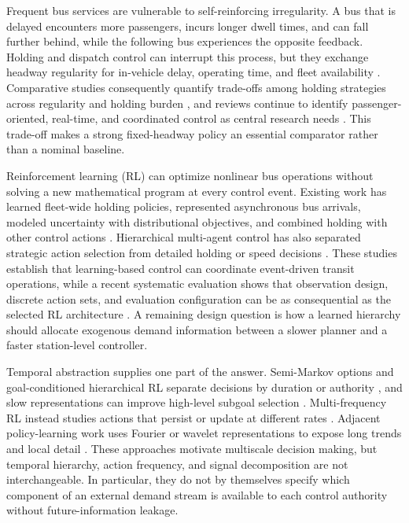 \documentclass[preprint,12pt,authoryear,nopreprintline]{elsarticle}
\begin{document}
Frequent bus services are vulnerable to self-reinforcing irregularity. A
bus that is delayed encounters more passengers, incurs longer dwell
times, and can fall further behind, while the following bus experiences
the opposite feedback. Holding and dispatch control can interrupt this
process, but they exchange headway regularity for in-vehicle delay,
operating time, and fleet availability
\citep{daganzo2009headway, xuan2011dynamic}. Comparative studies
consequently quantify trade-offs among holding strategies across
regularity and holding burden \citep{berrebi2018comparing}, and reviews
continue to identify passenger-oriented, real-time, and coordinated
control as central research needs
\citep{ibarra2015planning, gkiotsalitis2021atstop}. This trade-off makes
a strong fixed-headway policy an essential comparator rather than a
nominal baseline.

Reinforcement learning (RL) can optimize nonlinear bus operations
without solving a new mathematical program at every control event.
Existing work has learned fleet-wide holding policies, represented
asynchronous bus arrivals, modeled uncertainty with distributional
objectives, and combined holding with other control actions
\citep{wang2020dynamic, wang2021asynchronous, wang2023robust, rodriguez2023cooperative}.
Hierarchical multi-agent control has also separated strategic action
selection from detailed holding or speed decisions
\citep{yu2024hierarchical}. These studies establish that learning-based
control can coordinate event-driven transit operations, while a recent
systematic evaluation shows that observation design, discrete action
sets, and evaluation configuration can be as consequential as the
selected RL architecture \citep{xu2025systematic}. A remaining design
question is how a learned hierarchy should allocate exogenous demand
information between a slower planner and a faster station-level
controller.

Temporal abstraction supplies one part of the answer. Semi-Markov
options and goal-conditioned hierarchical RL separate decisions by
duration or authority \citep{sutton1999between, nachum2018data}, and
slow representations can improve high-level subgoal selection
\citep{li2021slow}. Multi-frequency RL instead studies actions that
persist or update at different rates
\citep{lee2020multiple, metelli2020persistence, holt2025evocontrol}.
Adjacent policy-learning work uses Fourier or wavelet representations to
expose long trends and local detail
\citep{huang2025wavelet, duan2025adaptive}. These approaches motivate
multiscale decision making, but temporal hierarchy, action frequency,
and signal decomposition are not interchangeable. In particular, they do
not by themselves specify which component of an external demand stream
is available to each control authority without future-information
leakage.
\end{document}
